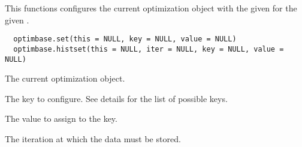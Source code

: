 %
\begin{Description}\relax
This functions configures the current optimization object with the given
 for the given .
\end{Description}
%
\begin{Usage}
\begin{verbatim}
  optimbase.set(this = NULL, key = NULL, value = NULL)
  optimbase.histset(this = NULL, iter = NULL, key = NULL, value = NULL)
\end{verbatim}
\end{Usage}
%
\begin{Arguments}
\begin{ldescription}
\item[\code{this}] The current optimization object.
\item[\code{key}] The key to configure. See details for the list of possible keys.
\item[\code{value}] The value to assign to the key.
\item[\code{iter}] The iteration at which the data must be stored.
\end{ldescription}
\end{Arguments}
%
